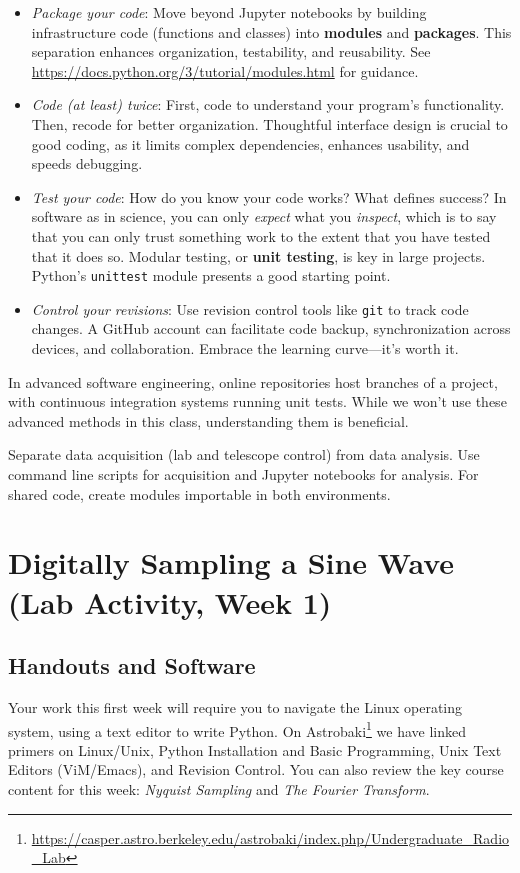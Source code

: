 \documentclass[11pt,preprint]{aastex}
\begin{document}
\begin{itemize}
    \item {\it Package your code}: Move beyond Jupyter notebooks by building infrastructure code (functions and classes) into {\bf modules} and {\bf packages}. This separation enhances organization, testability, and reusability. See \url{https://docs.python.org/3/tutorial/modules.html} for guidance.
    \item {\it Code (at least) twice}: First, code to understand your program's functionality. Then, recode for better organization. Thoughtful interface design is crucial to good coding, as it limits complex dependencies, enhances usability, and speeds debugging.
    \item {\it Test your code}: How do you know your code works? What defines success?  In software as in science, you can only {\it expect} what you {\it inspect}, which is to say that you can only trust something work to the extent that you have tested that it does so.
Modular testing, or {\bf unit testing}, is key in large projects. Python's {\tt unittest} module presents a good starting point.
    \item {\it Control your revisions}: Use revision control tools like {\tt git} to track code changes. A GitHub account can facilitate code backup, synchronization across devices, and collaboration. Embrace the learning curve---it's worth it.
\end{itemize}

\noindent
In advanced software engineering, online repositories host branches of a project, with continuous integration systems running unit tests. While we won't use these advanced methods in this class, understanding them is beneficial.

Separate data acquisition (lab and telescope control) from data analysis. Use command line scripts for acquisition and Jupyter notebooks for analysis. For shared code, create modules importable in both environments.


\section{Digitally Sampling a Sine Wave (Lab Activity, Week 1)}
\label{nyquist}

\subsection{Handouts and Software}

\noindent
Your work this first week will require you to navigate
the Linux operating system, using a text editor to write Python. 
On Astrobaki\footnote{\url{https://casper.astro.berkeley.edu/astrobaki/index.php/Undergraduate_Radio_Lab}}
we have linked primers on
Linux/Unix, Python Installation and Basic Programming, Unix Text Editors (ViM/Emacs), and Revision Control.  You can
also review the key course content for this week: {\it Nyquist Sampling}
 and {\it The Fourier Transform}.
\end{document}
